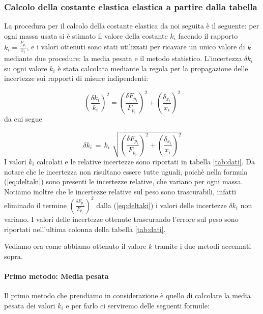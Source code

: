 \subsubsection{Calcolo della costante elastica elastica a partire dalla tabella}

La procedura per il calcolo della costante elastica da noi seguita è il seguente:
per ogni massa usata si è stimato il valore della costante $k_i$ facendo il rapporto $k_{i} = \frac{F_{p_{i}}}{x_{i}}$,
e i valori ottenuti sono stati utilizzati per ricavare un unico valore di $k$ mediante due procedure: la media pesata e il metodo statistico.
L'incertezza $\delta k_{i}$ su ogni valore $k_i$ è stata calcolata mediante la regola per la propagazione delle incertezze sui rapporti di misure indipendenti:

\begin{equation*}
	\left(\frac{\delta {k_{i}}}{k_{i}}\right)^2 = \left(\frac{\delta F_{p_{i}}}{F_{p_{i}}}\right)^2 + \left(\frac{\delta_{x_{i}}}{x_{i}}\right)^2 
\end{equation*}
%
da cui segue

\begin{equation}
	\delta k_{i} \,=\, k_i\,\, \sqrt{\left(\frac{\delta F_{p_{i}}}{F_{p_{i}}}\right)^2 + \left(\frac{\delta_{x_{i}}}{x_{i}}\right)^2} 
    \label{eq:deltaki}
\end{equation}
%
I valori $k_i$ calcolati e le relative incertezze sono riportati in tabella \ref{tab:dati}. Da notare che le incertezza
non risultano essere tutte uguali, poichè nella formula (\ref{eq:deltaki}) sono presenti le incertezze relative, che
variano per ogni massa. Notiamo inoltre che le incertezze relative sul peso sono trascurabili, infatti eliminado il termine
$\left(\frac{\delta F_{p_{i}}}{F_{p_{i}}}\right)^2$ dalla (\ref{eq:deltaki}) i valori delle incertezze $\delta k_i$ non variano.
I valori delle incertezze ottenute trascurando l'errore sul peso sono riportati nell'ultima colonna della tabella \ref{tab:dati}.

Vediamo ora come abbiamo ottenuto il valore $k$ tramite i due metodi accennati sopra.

\paragraph{Primo metodo: Media pesata\\}

Il primo metodo che prendiamo in considerazione è quello di calcolare la media pesata dei valori $k_{i}$ e per farlo ci serviremo delle seguenti formule:

